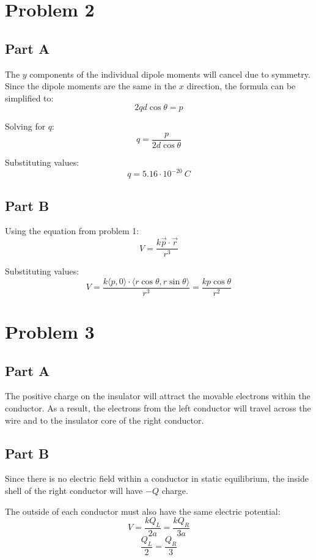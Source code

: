 \documentclass{article}
\begin{document}
\section*{Problem 2}

\subsection*{Part A}

The $y$ components of the individual dipole moments will cancel due to symmetry.
Since the dipole moments are the same in the $x$ direction, the formula can be
simplified to:
$$ 2 q d \cos \theta = p $$

Solving for $q$:
$$ q = \frac{ p }{ 2 d \cos \theta } $$

Substituting values:
$$ q = 5.16 \cdot 10^{-20}\ \si{C} $$

\subsection*{Part B}

Using the equation from problem 1:
$$ V = \frac{ k \vec{p} \cdot \vec{r} }{ r^{3} } $$

Substituting values:
$$ V = \frac{ k \langle p, 0 \rangle \cdot \langle r \cos \theta, r \sin \theta
\rangle }{ r^{3} } = \frac{ k p \cos \theta }{ r^{2} }$$

\section*{Problem 3}

\subsection*{Part A}

The positive charge on the insulator will attract the movable electrons within
the conductor. As a result, the electrons from the left conductor will travel
across the wire and to the insulator core of the right conductor.

\subsection*{Part B}

Since there is no electric field within a conductor in static equilibrium, the
inside shell of the right conductor will have $-Q$ charge.

\bigbreak

The outside of each conductor must also have the same electric potential:
$$ V = \frac{ k Q_{L} }{ 2a } = \frac{ k Q_{R} }{ 3a } $$
$$ \frac{ Q_{L} }{ 2 } = \frac{ Q_{R} }{ 3 } $$
\end{document}
